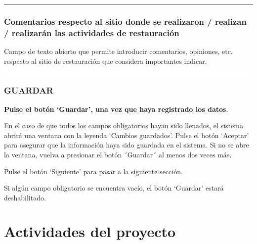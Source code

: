 \documentclass[
]{book}
\begin{document}
\begin{center}\rule{0.5\linewidth}{0.5pt}\end{center}

\hypertarget{comentarios-respecto-al-sitio-donde-se-realizaron-realizan-realizaruxe1n-las-actividades-de-restauraciuxf3n}{%
\subsection*{Comentarios respecto al sitio donde se realizaron / realizan / realizarán las actividades de restauración}\label{comentarios-respecto-al-sitio-donde-se-realizaron-realizan-realizaruxe1n-las-actividades-de-restauraciuxf3n}}

Campo de texto abierto que permite introducir comentarios, opiniones, etc. respecto al sitio de restauración que considera importantes indicar.

\begin{center}\rule{0.5\linewidth}{0.5pt}\end{center}

\hypertarget{guardar-4}{%
\subsection*{GUARDAR}\label{guardar-4}}

\textbf{Pulse el botón `Guardar', una vez que haya registrado los datos}.

En el caso de que todos los campos obligatorios hayan sido llenados, el sistema abrirá una ventana con la leyenda `Cambios guardados'. Pulse el botón `Aceptar' para asegurar que la información haya sido guardada en el sistema. Si no se abre la ventana, vuelva a presionar el botón ´Guardar´ al menos dos veces más.

Pulse el botón `Siguiente' para pasar a la siguiente sección.

Si algún campo obligatorio se encuentra vacío, el botón `Guardar' estará deshabilitado.

\hypertarget{actividades-del-proyecto}{%
\chapter*{Actividades del proyecto}\label{actividades-del-proyecto}}
\end{document}
